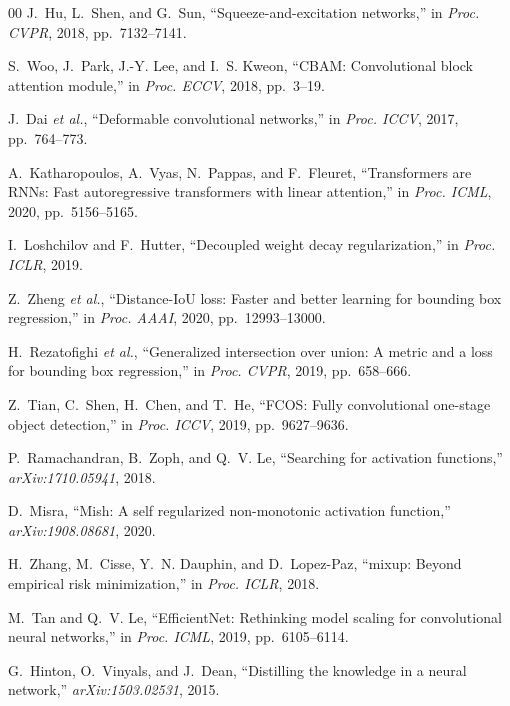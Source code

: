 \begin{thebibliography}{00}
J.~Hu, L.~Shen, and G.~Sun, ``Squeeze-and-excitation networks,''
in \textit{Proc. CVPR}, 2018, pp.~7132--7141.

S.~Woo, J.~Park, J.-Y. Lee, and I.~S. Kweon, ``CBAM: Convolutional block
attention module,'' in \textit{Proc. ECCV}, 2018, pp.~3--19.

J.~Dai \textit{et al.}, ``Deformable convolutional networks,''
in \textit{Proc. ICCV}, 2017, pp.~764--773.

A.~Katharopoulos, A.~Vyas, N.~Pappas, and F.~Fleuret, ``Transformers are
RNNs: Fast autoregressive transformers with linear attention,''
in \textit{Proc. ICML}, 2020, pp.~5156--5165.

I.~Loshchilov and F.~Hutter, ``Decoupled weight decay regularization,''
in \textit{Proc. ICLR}, 2019.

Z.~Zheng \textit{et al.}, ``Distance-IoU loss: Faster and better learning for
bounding box regression,'' in \textit{Proc. AAAI}, 2020,
pp.~12993--13000.

H.~Rezatofighi \textit{et al.}, ``Generalized intersection over union:
A metric and a loss for bounding box regression,''
in \textit{Proc. CVPR}, 2019, pp.~658--666.

Z.~Tian, C.~Shen, H.~Chen, and T.~He, ``FCOS: Fully convolutional one-stage
object detection,'' in \textit{Proc. ICCV}, 2019, pp.~9627--9636.

P.~Ramachandran, B.~Zoph, and Q.~V. Le, ``Searching for activation functions,''
\textit{arXiv:1710.05941}, 2018.

D.~Misra, ``Mish: A self regularized non-monotonic activation function,''
\textit{arXiv:1908.08681}, 2020.

H.~Zhang, M.~Cisse, Y.~N. Dauphin, and D.~Lopez-Paz, ``mixup: Beyond
empirical risk minimization,'' in \textit{Proc. ICLR}, 2018.

M.~Tan and Q.~V. Le, ``EfficientNet: Rethinking model scaling for convolutional
neural networks,'' in \textit{Proc. ICML}, 2019, pp.~6105--6114.

G.~Hinton, O.~Vinyals, and J.~Dean, ``Distilling the knowledge in a neural
network,'' \textit{arXiv:1503.02531}, 2015.


\end{thebibliography}
